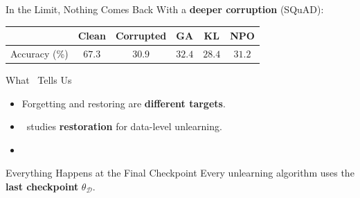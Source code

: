 \documentclass[aspectratio=169]{beamer}
\begin{document}
\begin{frame}{In the Limit, Nothing Comes Back}
    \centering
    \vspace{0.4em}
    {\small With a \textbf{deeper corruption} (SQuAD):}

    \vspace{1.0em}
    \begin{tabular}{@{}lccccc@{}}
        \toprule
        & Clean & Corrupted & GA & KL & NPO \\
        \midrule
        Accuracy (\%) & $67.3$ & $30.9$ & $32.4$ & $28.4$ & $31.2$ \\
        \bottomrule
    \end{tabular}

    \vspace{1.2em}
\end{frame}

\begin{frame}{What \RESTOR\ Tells Us}
    \vspace{0.5em}
    \begin{itemize}\small\setlength\itemsep{0.8em}
        \item Forgetting and restoring are \textbf{different targets}.
        \item \RESTOR\ studies \textbf{restoration} for data-level unlearning.
        \item {}
    \end{itemize}
\end{frame}

\begin{frame}{Everything Happens at the Final Checkpoint}
    \centering
    \vfill
    {\large Every unlearning algorithm uses the
        \textcolor{themecolor}{\textbf{last checkpoint}} $\theta_\mathcal{D}$.}

    \vspace{1.6em}
    \vfill
\end{frame}
\end{document}
